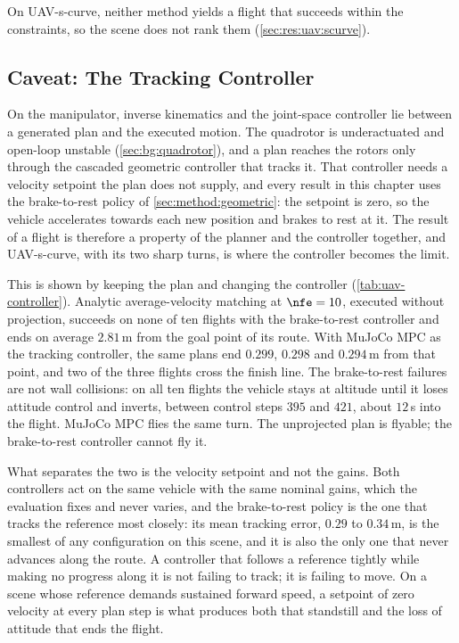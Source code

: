 On UAV-s-curve, neither method yields a flight that succeeds within the constraints, so the scene
does not rank them (\autoref{sec:res:uav:scurve}).

\subsection{Caveat: The Tracking Controller}\label{sec:res:uav:controller}

On the manipulator, inverse kinematics and the joint-space controller lie between a generated plan and
the executed motion. The quadrotor is underactuated and
open-loop unstable (\autoref{sec:bg:quadrotor}), and a plan reaches the rotors only through the cascaded
geometric controller that tracks it. That controller needs a velocity setpoint the plan does not supply,
and every result in this chapter uses the brake-to-rest policy of \autoref{sec:method:geometric}: the setpoint
is zero, so the vehicle accelerates towards each new position and brakes to rest at it. The result of a flight is therefore a property of the planner and the controller
together, and UAV-s-curve, with its two sharp turns, is where the controller becomes the limit.

This is shown by keeping the plan and changing the controller (\autoref{tab:uav-controller}). Analytic
average-velocity matching at $\nfe=10$, executed without projection, succeeds on none of ten flights
with the brake-to-rest controller and ends on average $2.81$\,m from the goal point of its route. With
MuJoCo MPC \parencite{howell2022predictive} as the tracking controller, the same plans end $0.299$, $0.298$
and $0.294$\,m from that point, and two of the three flights cross the finish line. The brake-to-rest
failures are not wall collisions: on all ten flights the vehicle stays at altitude until it loses attitude
control and inverts, between control steps $395$ and $421$, about $12$\,s into the flight. MuJoCo MPC flies
the same turn. The unprojected plan is flyable; the brake-to-rest controller cannot fly it.

What separates the two is the velocity setpoint and not the gains. Both controllers act on the same
vehicle with the same nominal gains, which the evaluation fixes and never varies, and the brake-to-rest
policy is the one that tracks the reference most closely: its mean tracking error, $0.29$ to $0.34$\,m,
is the smallest of any configuration on this scene, and it is also the only one that never advances along
the route. A controller that follows a reference tightly while making no progress along it is not failing
to track; it is failing to move. On a scene whose reference demands sustained forward speed, a setpoint
of zero velocity at every plan step is what produces both that standstill and the loss of attitude that
ends the flight.

